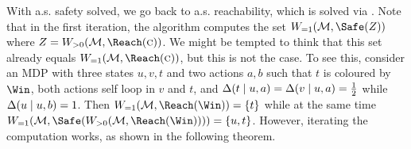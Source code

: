With a.s. safety solved, we go back to a.s. reachability, which is solved via . Note that in the first iteration, the algorithm computes the set %
$\winAS(\mdp,\Safe(Z))$ where $ Z =  \winPos(\mdp,\Reach(\genColour))$. We might be tempted to think that this set already equals $ \winAS(\mdp,\Reach(\genColour)) $, but this is not the case. To see this, consider an MDP with three states $ u,v,t $ and two actions $ a,b $ such that $ t $ is coloured by $ \Win $, both actions self loop in $ v $ and $ t $, and $ \Delta(t \mid u,a) = \Delta(v \mid u,a) = \frac{1}{2} $ while $ \Delta(u \mid u,b) = 1 $. Then $ \winAS(\mdp,\Reach(\Win)) = \{t\} $ while at the same time $ \winAS(\mdp,\Safe( \winPos(\mdp,\Reach(\Win)))) = \{u,t\}$. However, iterating the computation works, as shown in the following theorem.

